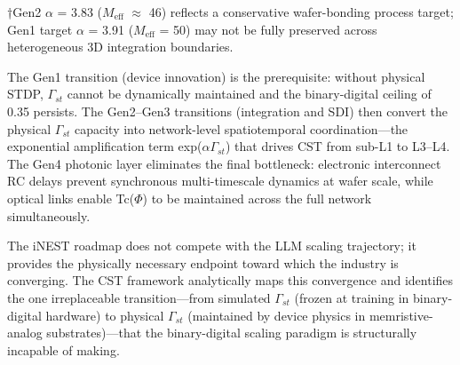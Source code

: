 \documentclass[a4paper,12pt]{article}
\begin{document}
†Gen2 $\alpha$ = 3.83 ($M_{\text{eff}}$ $\approx$ 46) reflects a conservative wafer-bonding process target; Gen1 target $\alpha$ = 3.91 ($M_{\text{eff}}$ = 50) may not be fully preserved across heterogeneous 3D integration boundaries.


The Gen1 transition (device innovation) is the prerequisite: without physical STDP, $\Gamma_{st}$ cannot be dynamically maintained and the binary-digital ceiling of 0.35 persists.
The Gen2--Gen3 transitions (integration and SDI) then convert the physical $\Gamma_{st}$ capacity into network-level spatiotemporal coordination---the exponential amplification term exp($\alpha$\cdot$\Gamma_{st}$) that drives CST from sub-L1 to L3--L4.
The Gen4 photonic layer eliminates the final bottleneck: electronic interconnect RC delays prevent synchronous multi-timescale dynamics at wafer scale, while optical links enable Tc($\Phi$) to be maintained across the full network simultaneously.


The iNEST roadmap does not compete with the LLM scaling trajectory; it provides the physically necessary endpoint toward which the industry is converging.
The CST framework analytically maps this convergence and identifies the one irreplaceable transition---from simulated $\Gamma_{st}$ (frozen at training in binary-digital hardware) to physical $\Gamma_{st}$ (maintained by device physics in memristive-analog substrates)---that the binary-digital scaling paradigm is structurally incapable of making.
\end{document}
